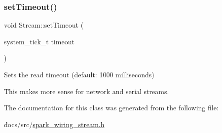\subsubsection{\texorpdfstring{set\+Timeout()}{setTimeout()}}
{\footnotesize\ttfamily void Stream\+::set\+Timeout (\begin{DoxyParamCaption}\item[{system\+\_\+tick\+\_\+t}]{timeout }\end{DoxyParamCaption})}



Sets the read timeout (default\+: 1000 milliseconds) 

This makes more sense for network and serial streams. 

The documentation for this class was generated from the following file\+:\begin{DoxyCompactItemize}
\item 
docs/src/\mbox{\hyperlink{spark__wiring__stream_8h}{spark\+\_\+wiring\+\_\+stream.\+h}}\end{DoxyCompactItemize}
